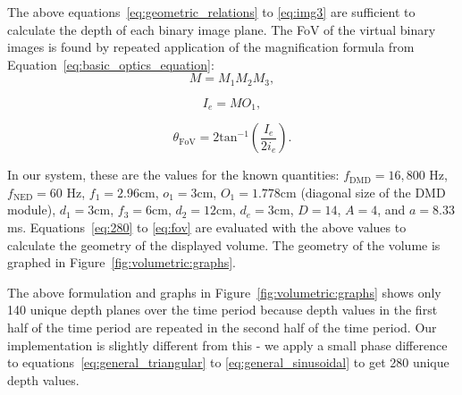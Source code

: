 The above equations~\eqref{eq:geometric_relations} to \eqref{eq:img3} are sufficient to calculate the depth of each binary image plane. The FoV of the virtual binary images is found by repeated application of the magnification formula from  Equation~\eqref{eq:basic_optics_equation}:
\begin{equation}
M = M_1M_2M_3,
\label{eq:combined_magnification}
\end{equation}

\begin{equation}
I_e = MO_1,
\label{eq:virtual_image_size}
\end{equation}

\begin{equation}
\theta_{\text{FoV}} = 2\text{tan}^{-1}\left(\frac{I_e}{2i_e}\right).
\label{eq:fov}
\end{equation}

In our system, these are the values for the known quantities: $f_{\text{DMD}} = 16,800$ Hz, $f_{\text{NED}} = 60$ Hz, $f_1 = 2.96$cm, $o_1 = 3$cm, $O_1 = 1.778$cm (diagonal size of the DMD module), $d_1 = 3$cm, $f_3 = 6$cm, $d_2 = 12$cm, $d_e = 3$cm, $D = 14$, $A = 4$, and $a = 8.33$ ms. Equations~\eqref{eq:280} to \eqref{eq:fov} are evaluated with the above values to calculate the geometry of the displayed volume. The geometry of the volume is graphed in Figure~\ref{fig:volumetric:graphs}. 


The above formulation and graphs in Figure~\ref{fig:volumetric:graphs} shows only 140 unique depth planes over the time period because depth values in the first half of the time period are repeated in the second half of the time period. Our implementation is slightly different from this - we apply a small phase difference to equations~\eqref{eq:general_triangular} to \eqref{eq:general_sinusoidal} to get 280 unique depth values. 

